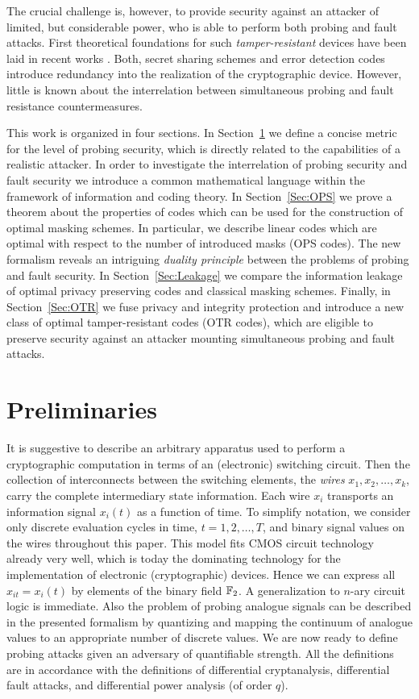 \documentclass[11pt]{llncs}
\begin{document}
The crucial challenge is, however,
to provide security against an attacker of limited, but considerable power,
who is able to perform both probing and fault attacks.
First theoretical foundations for such \emph{tamper-resistant} devices
have been laid in recent works
\cite{Gennaro2004AlgorithmicTamperProof,Ishai2006PrivateCircuitsII}.
Both, secret sharing schemes and error detection codes introduce
redundancy into the realization of the cryptographic device.
However, little is known about the interrelation between simultaneous probing and
fault resistance countermeasures.

This work is organized in four sections.
In Section~\ref{Sec:Preliminaries} we define a concise metric
for the level of probing security,
which is directly related to the capabilities of a realistic attacker.
In order to investigate the interrelation of probing security
and fault security we introduce a common mathematical language
within the framework of information and coding theory.
In Section~\ref{Sec:OPS} we prove a theorem about the
properties of codes which can be used for the construction
of optimal masking schemes.
In particular, we describe linear codes which
are optimal with respect to the number of introduced masks (OPS codes).
The new formalism reveals an intriguing \emph{duality principle}
between the problems of probing and fault security.
In Section~\ref{Sec:Leakage} we compare the
information leakage of optimal privacy preserving codes and
classical masking schemes.
Finally, in Section~\ref{Sec:OTR} we fuse privacy and integrity protection
and introduce a new class of
optimal tamper-resistant codes (OTR codes),
which are eligible to preserve security against an attacker mounting
simultaneous probing and fault attacks.


\section{Preliminaries}  \label{Sec:Preliminaries}
It is suggestive to describe an arbitrary apparatus used to
perform a cryptographic computation in terms of an (electronic) switching circuit.
Then the collection of interconnects between the switching elements,
the \emph{wires} $x_1, x_2, \dots, x_k$,
carry the complete intermediary state information.
Each wire $x_i$ transports an information signal $x_{i}(t)$
as a function of time.
To simplify notation, we consider only
discrete evaluation cycles in time, $t=1,2,\dots, T$,
and binary signal values on the wires throughout this paper.
This model fits CMOS circuit technology already very well,
which is today the dominating technology for
the implementation of electronic (cryptographic) devices.
Hence we can express all $x_{it} = x_{i}(t)$ by elements of the binary field $\mathbb{F}_2$.
A generalization to $n$-ary circuit logic is immediate.
Also the problem of probing analogue signals can be described in
the presented formalism by quantizing and mapping the continuum
of analogue values to an appropriate number of discrete values.
We are now ready to define probing attacks
given an adversary of quantifiable strength. All the definitions are in
accordance with the definitions of differential cryptanalysis,
differential fault attacks, and differential power analysis (of order $q$).
\end{document}
